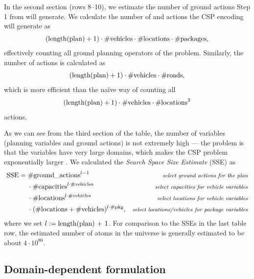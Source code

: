 In the second section (rows 8--10), we estimate the number of ground actions
Step 1 from \citet[Section~8.3.1]{Ghallab2004} will generate.
We calculate the number of \pickup{} and \drop{} actions the CSP encoding will generate
as $$(\textrm{length(plan)} + 1) \cdot \textrm{\#vehicles} \cdot \textrm{\#locations} \cdot \textrm{\#packages},$$
effectively counting all ground planning operators of the problem. Similarly,
the number of \drive{} actions is calculated as
$$(\textrm{length(plan)} + 1) \cdot \textrm{\#vehicles} \cdot \textrm{\#roads},$$
which is more efficient than the na{\"{i}}ve way of
counting all
$$(\textrm{length(plan)} + 1) \cdot \textrm{\#vehicles} \cdot \textrm{\#locations}^2$$
actions.

As we can see from the third section of the table, the number of variables
(planning variables and ground actions) is not extremely high
--- the problem is that the variables have very large domains,
which makes the CSP problem exponentially larger \citep[Section~8.3.2]{Ghallab2004}.
We calculated the \textit{Search Space Size Estimate} (SSE) as
\begin{align*}
\textrm{SSE} =\; &\textrm{\#ground\_actions}^{l-1} & \textit{\footnotesize select ground actions for the plan}\\
&\cdot \textrm{\#capacities}^{l \cdot \textrm{\#vehicles}} & \textit{\footnotesize select capacities for vehicle variables}\\
&\cdot \textrm{\#locations}^{l \cdot \textrm{\#vehicles}} & \textit{\footnotesize select locations for vehicle variables}\\
&\cdot (\textrm{\#locations} + \textrm{\#vehicles})^{l \cdot \textrm{\#pkg}}, & \textit{\footnotesize select locations/vehicles for package variables}
\end{align*}
where we set $l := \textrm{length(plan) + 1}$.
For comparison to the SSEs in the last table row, 
the estimated number of atoms in the universe is generally estimated to be about $4 \cdot 10^{80}$.

\subsection{Domain-dependent formulation}\label{csp-custom-repr}



